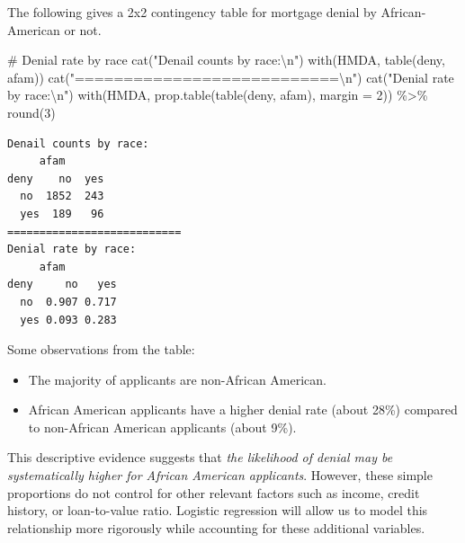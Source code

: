 \documentclass[
  12pt,
  a4paper,
]{scrbook}
\newenvironment{Shaded}{\begin{snugshade}}{\end{snugshade}}
\newcommand{\AttributeTok}[1]{\textcolor[rgb]{0.40,0.45,0.13}{#1}}
\newcommand{\CommentTok}[1]{\textcolor[rgb]{0.37,0.37,0.37}{#1}}
\newcommand{\DecValTok}[1]{\textcolor[rgb]{0.68,0.00,0.00}{#1}}
\newcommand{\FunctionTok}[1]{\textcolor[rgb]{0.28,0.35,0.67}{#1}}
\newcommand{\NormalTok}[1]{\textcolor[rgb]{0.00,0.23,0.31}{#1}}
\newcommand{\SpecialCharTok}[1]{\textcolor[rgb]{0.37,0.37,0.37}{#1}}
\newcommand{\StringTok}[1]{\textcolor[rgb]{0.13,0.47,0.30}{#1}}
\providecommand{\tightlist}{%
  \setlength{\itemsep}{0pt}\setlength{\parskip}{0pt}}
\renewcommand{\tightlist}{\setlength{\itemsep}{0.5\baselineskip}\setlength{\parskip}{0.2\baselineskip}}
\theoremstyle{plain}
\theoremstyle{definition}
\theoremstyle{remark}
\begin{document}
The following gives a 2x2 contingency table for mortgage denial by
African-American or not.

\begin{Shaded}
\begin{Highlighting}[]
\CommentTok{\# Denial rate by race}
\FunctionTok{cat}\NormalTok{(}\StringTok{"Denail counts by race:}\SpecialCharTok{\textbackslash{}n}\StringTok{"}\NormalTok{)}
\FunctionTok{with}\NormalTok{(HMDA, }\FunctionTok{table}\NormalTok{(deny, afam))}
\FunctionTok{cat}\NormalTok{(}\StringTok{"===========================}\SpecialCharTok{\textbackslash{}n}\StringTok{"}\NormalTok{)}
\FunctionTok{cat}\NormalTok{(}\StringTok{"Denial rate by race:}\SpecialCharTok{\textbackslash{}n}\StringTok{"}\NormalTok{)}
\FunctionTok{with}\NormalTok{(HMDA, }\FunctionTok{prop.table}\NormalTok{(}\FunctionTok{table}\NormalTok{(deny, afam), }\AttributeTok{margin =} \DecValTok{2}\NormalTok{)) }\SpecialCharTok{\%\textgreater{}\%} \FunctionTok{round}\NormalTok{(}\DecValTok{3}\NormalTok{)}
\end{Highlighting}
\end{Shaded}

\begin{verbatim}
Denail counts by race:
     afam
deny    no  yes
  no  1852  243
  yes  189   96
===========================
Denial rate by race:
     afam
deny     no   yes
  no  0.907 0.717
  yes 0.093 0.283
\end{verbatim}

Some observations from the table:

\begin{itemize}
\tightlist
\item
  The majority of applicants are non-African American.
\item
  African American applicants have a higher denial rate (about 28\%)
  compared to non-African American applicants (about 9\%).
\end{itemize}

\begin{tcolorbox}[enhanced jigsaw, arc=.35mm, bottomrule=.15mm, breakable, colback=white, colframe=quarto-callout-note-color-frame, left=2mm, leftrule=.75mm, opacityback=0, rightrule=.15mm, toprule=.15mm]

This descriptive evidence suggests that \emph{the likelihood of denial
may be systematically higher for African American applicants}. However,
these simple proportions do not control for other relevant factors such
as income, credit history, or loan-to-value ratio. Logistic regression
will allow us to model this relationship more rigorously while
accounting for these additional variables.

\end{tcolorbox}
\end{document}
